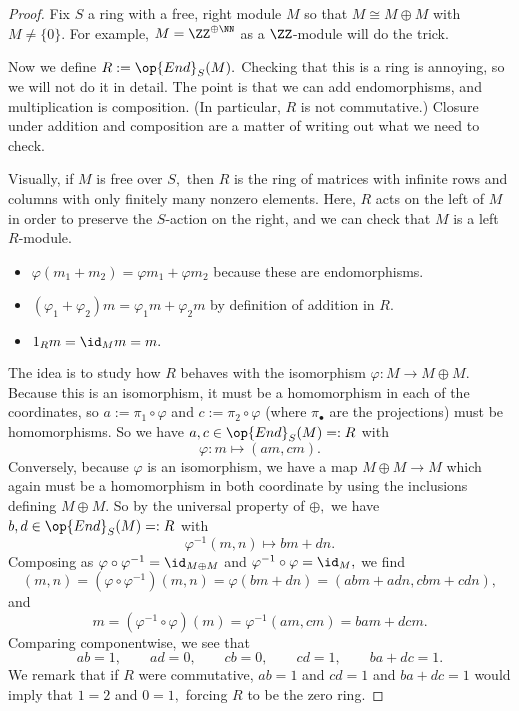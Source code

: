 \begin{proof}
	Fix $S$ a ring with a free, right module $M$ so that $M\cong M\oplus M$ with $M\ne\{0\}.$ For example, $M=\ZZ^{\oplus\NN}$ as a $\ZZ$-module will do the trick.

	Now we define $R:=\op{End}_S(M).$ Checking that this is a ring is annoying, so we will not do it in detail. The point is that we can add endomorphisms, and multiplication is composition. (In particular, $R$ is not commutative.) Closure under addition and composition are a matter of writing out what we need to check.
	
	Visually, if $M$ is free over $S,$ then $R$ is the ring of matrices with infinite rows and columns with only finitely many nonzero elements. Here, $R$ acts on the left of $M$ in order to preserve the $S$-action on the right, and we can check that $M$ is a left $R$-module.
	\begin{itemize}
		\item $\varphi(m_1+m_2)=\varphi m_1+\varphi m_2$ because these are endomorphisms.
		\item $(\varphi_1+\varphi_2)m=\varphi_1m+\varphi_2m$ by definition of addition in $R.$
		\item $1_Rm=\id_Mm=m.$
	\end{itemize}
	The idea is to study how $R$ behaves with the isomorphism $\varphi:M\to M\oplus M.$ Because this is an isomorphism, it must be a homomorphism in each of the coordinates, so $a:=\pi_1\circ\varphi$ and $c:=\pi_2\circ\varphi$ (where $\pi_\bullet$ are the projections) must be homomorphisms. So we have $a,c\in\op{End}_S(M)=:R$ with
	\[\varphi:m\mapsto(am,cm).\]
	Conversely, because $\varphi$ is an isomorphism, we have a map $M\oplus M\to M$ which again must be a homomorphism in both coordinate by using the inclusions defining $M\oplus M.$ So by the universal property of $\oplus,$ we have $b,d\in\op{End}_S(M)=:R$ with
	\[\varphi^{-1}(m,n)\mapsto bm+dn.\]
	Composing as $\varphi\circ\varphi^{-1}=\id_{M\oplus M}$ and $\varphi^{-1}\circ\varphi=\id_M,$ we find
	\[(m,n)=\left(\varphi\circ\varphi^{-1}\right)(m,n)=\varphi(bm+dn)=(abm+adn,cbm+cdn),\]
	and
	\[m=\left(\varphi^{-1}\circ\varphi\right)(m)=\varphi^{-1}(am,cm)=bam+dcm.\]
	Comparing componentwise, we see that
	\[ab=1,\qquad ad=0,\qquad cb=0,\qquad cd=1,\qquad ba+dc=1.\]
	We remark that if $R$ were commutative, $ab=1$ and $cd=1$ and $ba+dc=1$ would imply that $1=2$ and $0=1,$ forcing $R$ to be the zero ring.
	

\end{proof}
